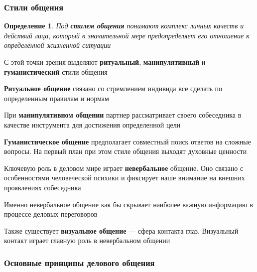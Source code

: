 \documentclass[a4paper,14pt]{extarticle}
\newtheorem{definition}{Определение}
\begin{document}
\subsubsection{Стили общения}

\begin{definition}
    Под \textbf{стилем общения} понимают комплекс личных качеств и действий лица, который в значительной мере предопределяет его отношение к определенной жизненной ситуации
\end{definition}

С этой точки зрения выделяют \textbf{ритуальный}, \textbf{манипулятивный} и \textbf{гуманистический} стили общения

\hfill

\textbf{Ритуальное общение} связано со стремлением индивида все сделать по определенным правилам и нормам

При \textbf{манипулятивном общении} партнер рассматривает своего собеседника в качестве инструмента для достижения определенной цели

\textbf{Гуманистическое общение} предполагает совместный поиск ответов на сложные вопросы. На первый план при этом стиле общения выходят духовные ценности

\hfill

Ключевую роль в деловом мире играет \textbf{невербальное} общение. Оно связано с особенностями человеческой психики и фиксирует наше внимание на внешних проявлениях собеседника

Именно невербальное общение как бы скрывает наиболее важную информацию в процессе деловых переговоров

Также существует \textbf{визуальное общение} — сфера контакта глаз. Визуальный контакт играет главную роль в невербальном общении

\subsubsection{Основные принципы делового общения}


\begin{multienumerate}
\end{multienumerate}
\end{document}
